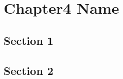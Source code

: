
\chapter{Chapter4 Name} %
\label{ch4}
\setlength{\parindent}{4ex}

\section{Section 1}
\lipsum[50]

\section{Section 2}
\lipsum[50]